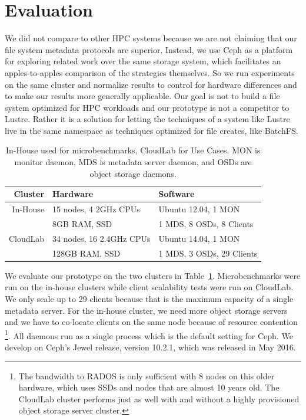 \section{Evaluation}
\label{sec:evaluation}

We did not compare to other HPC systems because we are not claiming that our
file system metadata protocols are superior. Instead, we use Ceph as a platform
for exploring related work over the same storage system, which facilitates an
apples-to-apples comparison of the strategies themselves.  So we run
experiments on the same cluster and normalize results to control for hardware
differences and to make our results more generally applicable.  Our goal is not
to build a file system optimized for HPC workloads and our prototype is not a
competitor to Lustre. Rather it is a solution for letting the techniques of a
system like Lustre live in the same namespace as techniques optimized for file
creates, like BatchFS. 

\begin{table}
\begin{tabular}{ r | l | l}
  Cluster  & Hardware               & Software \\\hline
  In-House & 15 nodes, 4 2GHz CPUs  & Ubuntu 12.04, 1 MON\\
           & 8GB RAM, SSD           & 1 MDS, 8 OSDs, 8 Clients\\
  CloudLab & 34 nodes, 16 2.4GHz CPUs & Ubuntu 14.04, 1 MON\\
           & 128GB RAM, SSD         & 1 MDS, 3 OSDs, 29 Clients
\end{tabular}
\caption{In-House used for microbenchmarks, CloudLab for Use Cases. MON is
monitor daemon, MDS is metadata server daemon, and OSDs are object storage
daemons.\label{table:clusters}} 
\end{table}

We evaluate our prototype on the two clusters in Table~\ref{table:clusters}.
Microbenchmarks were run on the in-house clusters while client scalability
tests were run on CloudLab. We only scale up to 29 clients because that is the
maximum capacity of a single metadata server. For the in-house cluster, we need
more object storage servers and we have to co-locate clients on the same node
because of resource contention \footnote{The bandwidth to RADOS is only
sufficient with 8 nodes on this older hardware, which uses SSDs and nodes that
are almost 10 years old.  The CloudLab cluster performs just as well with and
without a highly provisioned object storage server cluster.}. All daemons run
as a single process which is the default setting for Ceph. We develop on Ceph's
Jewel release, version 10.2.1, which was released in May 2016.

